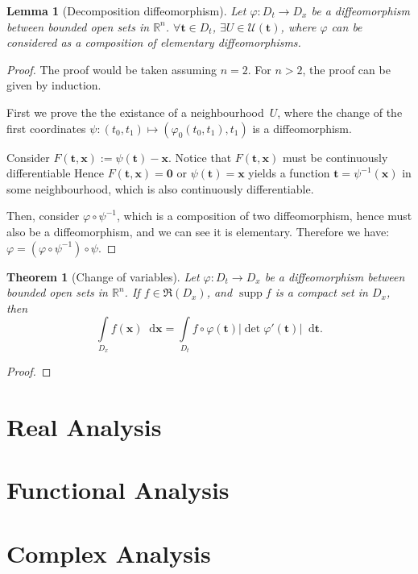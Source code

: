 \documentclass[openany]{book}
\theoremstyle{plain}
\newtheorem{theorem}{Theorem}[section] %
\newtheorem{lemma}{Lemma} %
\theoremstyle{definition}
\newcommand{\dif}{\mathop{}\!\mathrm{d}} %
\newcommand*{\bv}{\boldsymbol} %
\DeclareMathOperator{\supp}{supp}
\begin{document}
\begin{lemma}[Decomposition diffeomorphism]
	Let $\varphi \colon D_t \to D_x$ be a diffeomorphism between bounded open sets in $\mathbb R^n$. 
	$\forall \bv t \in D_t$, $\exists U \in \mathscr U(\bv t)$, where $\varphi$ can be considered as a composition of elementary diffeomorphisms.
\end{lemma}
\begin{proof}
	The proof would be taken assuming $n = 2$. For $n > 2$, the proof can be given by induction.

	First we prove the the existance of a neighbourhood~$U$, where the change of the first coordinates $\psi \colon (t_0, t_1) \mapsto (\varphi_0(t_0, t_1), t_1)$ is a diffeomorphism.

	Consider $F(\bv t, \bv x) := \psi(\bv t) - \bv x$. 
	Notice that $F(\bv t, \bv x)$ must be continuously differentiable
	Hence $F(\bv t, \bv x) = \bv 0 $ or $\psi(\bv t) = \bv x$ yields a function $\bv t = \psi^{-1}(\bv x)$ in some neighbourhood, which is also continuously differentiable.

	Then, consider $\varphi \circ \psi^{-1}$, which is a composition of two diffeomorphism, hence must also be a diffeomorphism, and we can see it is elementary. 
	Therefore we have: $\varphi = (\varphi \circ \psi^{-1}) \circ \psi$.
\end{proof}

\begin{theorem}[Change of variables]
	Let $\varphi \colon D_t \to D_x$ be a diffeomorphism between bounded open sets in $\mathbb R^n$.
	If $f \in \mathfrak R(D_x)$, and $\supp f$ is a compact set in $D_x$, then
	\begin{equation*}
		\int\limits_{D_x} f(\bv x) \dif \bv x = \int\limits_{D_t} f \circ \varphi(\bv t) |\det \varphi'(\bv t)|\dif \bv t.
	\end{equation*}
\end{theorem}
\begin{proof}
	
\end{proof}


\part{Real Analysis}


\part{Functional Analysis}
\part{Complex Analysis}


\backmatter{}

\nocite{*} %
\printbibliography[heading=bibliography, title={Bibliography}]

\printindex[symbol]

\printindex
\end{document}
